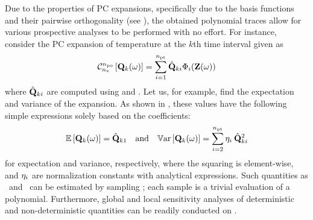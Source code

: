 Due to the properties of PC expansions, specifically due to the basis functions and their pairwise orthogonality (see ), the obtained polynomial traces allow for various prospective analyses to be performed with no effort. For instance, consider the PC expansion of temperature at the $k$th time interval given as
\vspace{-0.2em}%
\begin{equation} \elabel{pc-k}
  \oPC{\nvars}{\pcorder}{\vTO_k(\o)} = \sum_{i = 1}^{\pcterms} \pcc{\vTO}_{ki} \pcb_i(\vZ(\o))
\end{equation}
\vspace{-0.2em}%
where $\hat{\mathbf{Q}}_{ki}$ are computed using  and . Let us, for example, find the expectation and variance of the expansion. As shown in , these values have the following simple expressions solely based on the coefficients:
\vspace{-0.2em}%
\begin{equation} \elabel{pc-moments}
  \oExp{\vTO_k(\o)} = \pcc{\vTO}_{k1} \hspace{1em} \text{and} \hspace{1em} \oVar{\vTO_k(\o)} = \sum_{i = 2}^{\pcterms} \pcn_i \: \pcc{\vTO}_{ki}^2
\end{equation}
\vspace{-0.2em}%
for expectation and variance, respectively, where the squaring is element-wise, and $\eta_i$ are normalization constants with analytical expressions. Such quantities as \cdfs\ and \pdfs\ can be estimated by sampling ; each sample is a trivial evaluation of a polynomial. Furthermore, global and local sensitivity analyses of deterministic and non-deterministic quantities can be readily conducted on .
